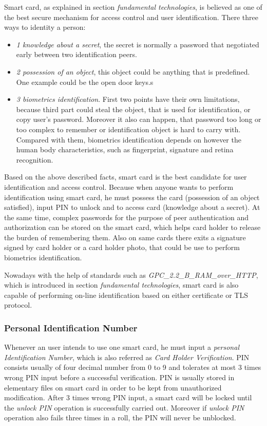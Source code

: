 Smart card, as explained in section \emph{fundamental technologies}, is believed as one of the best secure mechanism for access control and user identification. There three ways to identity a person\cite{handbuch}:
\begin{itemize}
\item \emph{1 knowledge about a secret}, the secret is normally a password that negotiated early between two identification peers.
\item \emph{2 possession of an object}, this object could be anything that is predefined. One example could be the open door keys.s
\item \emph{3 biometrics identification}. First two points have their own limitations, because third part could steal the object, that is used for identification, or copy user's password. Moreover it also can happen, that password too long or too complex to remember or identification object is hard to carry with. Compared with them, biometrics identification depends on however the human body characteristics, such as fingerprint, signature and retina recognition.
\end{itemize}
Based on the above described facts, smart card is the best candidate for user identification and access control. Because when anyone wants to perform identification using smart card, he must possess the card (possession of an object satisfied), input PIN to unlock and to access card (knowledge about a secret). At the same time, complex passwords for the purpose of peer authentication and authorization can be stored on the smart card, which helps card holder to release the burden of remembering them. Also on same cards there exits a signature signed by card holder or a card holder photo, that could be use to perform biometrics identification. 

Nowadays with the help of standards such as \emph{GPC\_2.2\_B\_RAM\_over\_HTTP}, which is introduced in section \emph{fundamental technologies}, smart card is also capable of performing on-line identification based on either certificate or TLS protocol.

\subsubsection{Personal Identification Number}
Whenever an user intends to use one smart card, he must input a \emph{personal Identification Number}, which is also referred as \emph{Card Holder Verification}. PIN consists usually of four decimal number from 0 to 9 and tolerates at most 3 times wrong PIN input before a successful verification. PIN is usually stored in elementary files\cite{smart_card_access} on smart card in order to be kept from unauthorized modification. After 3 times wrong PIN input, a smart card will be locked until the \emph{unlock PIN} operation is successfully carried out. Moreover if \emph{unlock PIN} operation also fails three times in a roll, the PIN will never be unblocked\cite{smart_card_access}.

